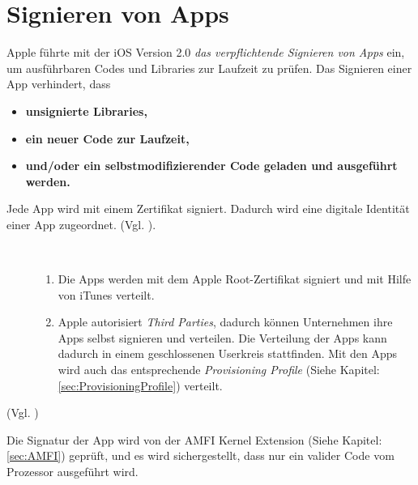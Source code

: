 \section{Signieren von Apps}
\label{sec:SigningProcess}

Apple führte mit der iOS Version 2.0 \textit{\glqq das verpflichtende Signieren von Apps\grqq{}} ein, um ausführbaren Codes und Libraries zur Laufzeit zu prüfen. Das Signieren einer App verhindert, dass 
\begin{itemize}
    \item \textbf{unsignierte Libraries,
}    \item \textbf{ein neuer Code zur Laufzeit,} 
    \item \textbf{und/oder ein selbstmodifizierender Code geladen und ausgeführt werden.}
\end{itemize}
Jede App wird mit einem Zertifikat signiert. Dadurch wird eine digitale Identität einer App zugeordnet. (Vgl. \cite{Cert[2], Cert[3]}).
\begin{description}
    \item[\parbox{\textwidth} {Eine App kann auf zwei Arten signiert werden}]~\par
   \begin{enumerate}
        \item Die Apps werden mit dem Apple Root-Zertifikat signiert und mit Hilfe von iTunes verteilt. 
        
        \item Apple autorisiert \textit{\glqq Third Parties\grqq}, dadurch können Unternehmen ihre Apps selbst signieren und verteilen. Die Verteilung der Apps kann dadurch in einem geschlossenen Userkreis stattfinden. Mit den Apps wird auch das entsprechende \textit{\glqq Provisioning Profile\grqq{}} (Siehe Kapitel: \ref{sec:ProvisioningProfile}) verteilt.
    \end{enumerate} 
\end{description} 
(Vgl. \cite{Sign[1], Sign[2], Sign[3], Sign[4], Sign[5], ROP[1]}) \par 
Die Signatur der App wird von der AMFI Kernel Extension (Siehe Kapitel: \ref{sec:AMFI}) geprüft, und es wird sichergestellt, dass nur ein valider Code vom Prozessor ausgeführt wird.    
 
